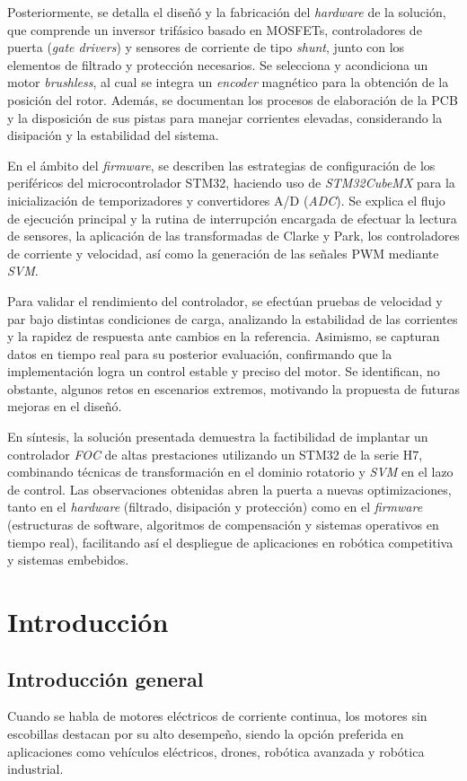 \documentclass[11pt]{report}
\begin{document}
Posteriormente, se detalla el diseñó y la fabricación del \emph{hardware} de la solución, que comprende un inversor trifásico basado en MOSFETs, controladores de puerta (\emph{gate drivers}) y sensores de corriente de tipo \emph{shunt}, junto con los elementos de filtrado y protección necesarios. Se selecciona y acondiciona un motor \emph{brushless}, al cual se integra un \emph{encoder} magnético para la obtención de la posición del rotor. Además, se documentan los procesos de elaboración de la PCB y la disposición de sus pistas para manejar corrientes elevadas, considerando la disipación y la estabilidad del sistema.

En el ámbito del \emph{firmware}, se describen las estrategias de configuración de los periféricos del microcontrolador STM32, haciendo uso de \emph{STM32CubeMX} para la inicialización de temporizadores y convertidores A/D (\emph{ADC}). Se explica el flujo de ejecución principal y la rutina de interrupción encargada de efectuar la lectura de sensores, la aplicación de las transformadas de Clarke y Park, los controladores de corriente y velocidad, así como la generación de las señales PWM mediante \emph{SVM}.

Para validar el rendimiento del controlador, se efectúan pruebas de velocidad y par bajo distintas condiciones de carga, analizando la estabilidad de las corrientes y la rapidez de respuesta ante cambios en la referencia. Asimismo, se capturan datos en tiempo real para su posterior evaluación, confirmando que la implementación logra un control estable y preciso del motor. Se identifican, no obstante, algunos retos en escenarios extremos, motivando la propuesta de futuras mejoras en el diseñó.

En síntesis, la solución presentada demuestra la factibilidad de implantar un controlador \emph{FOC} de altas prestaciones utilizando un STM32 de la serie H7, combinando técnicas de transformación en el dominio rotatorio y \emph{SVM} en el lazo de control. Las observaciones obtenidas abren la puerta a nuevas optimizaciones, tanto en el \emph{hardware} (filtrado, disipación y protección) como en el \emph{firmware} (estructuras de software, algoritmos de compensación y sistemas operativos en tiempo real), facilitando así el despliegue de aplicaciones en robótica competitiva y sistemas embebidos.

\newpage
\chapter{Introducción}
\section{Introducción general}
Cuando se habla de motores eléctricos de corriente continua, los motores sin escobillas destacan por su alto desempeño, siendo la opción preferida en aplicaciones como vehículos eléctricos, drones, robótica avanzada y robótica industrial.
\end{document}
